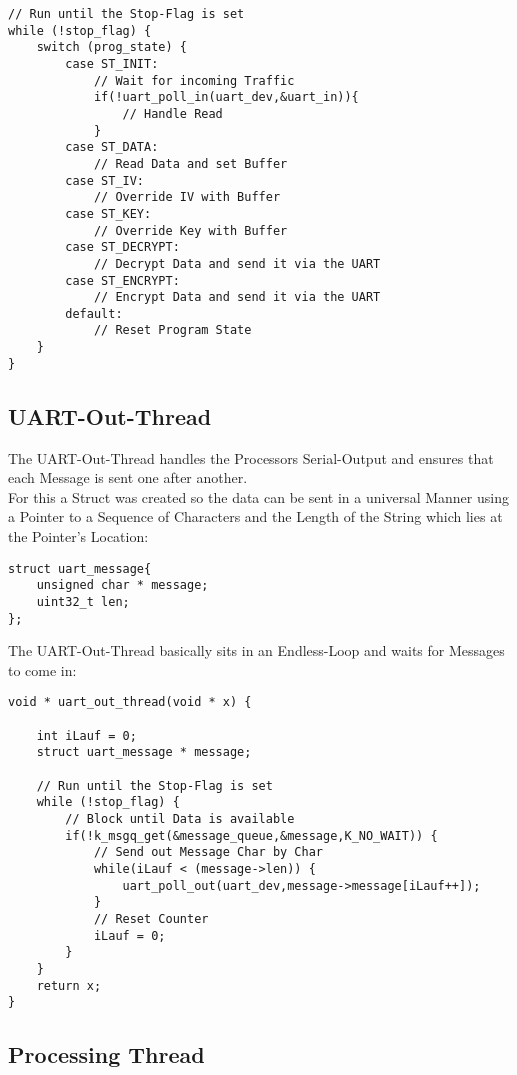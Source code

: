 \begin{lstlisting}[style=CStyle,caption=State Machine Pseudo-Code]
// Run until the Stop-Flag is set
while (!stop_flag) {
	switch (prog_state) {
		case ST_INIT:
            // Wait for incoming Traffic
            if(!uart_poll_in(uart_dev,&uart_in)){
				// Handle Read
			}
	    case ST_DATA:
			// Read Data and set Buffer
	    case ST_IV:
			// Override IV with Buffer
	    case ST_KEY:
			// Override Key with Buffer
	    case ST_DECRYPT:
			// Decrypt Data and send it via the UART
	    case ST_ENCRYPT:
			// Encrypt Data and send it via the UART
	    default:
			// Reset Program State
	}
}
\end{lstlisting}

\pagebreak

\subsection{UART-Out-Thread}

The UART-Out-Thread handles the Processors Serial-Output and ensures
that each Message is sent one after another.
\\
For this a Struct was created so the data can be sent in a universal
Manner using a Pointer to a Sequence of Characters and the Length of
the String which lies at the Pointer's Location:

\begin{lstlisting}[style=CStyle,caption=Message Struct Definition]
struct uart_message{
	unsigned char * message;
	uint32_t len;
};
\end{lstlisting}

The UART-Out-Thread basically sits in an Endless-Loop and waits
for Messages to come in:

\begin{lstlisting}[style=CStyle,caption=UART Out Thread Pseudo-Code]
void * uart_out_thread(void * x) {

	int iLauf = 0;
	struct uart_message * message;

	// Run until the Stop-Flag is set
	while (!stop_flag) {
		// Block until Data is available
		if(!k_msgq_get(&message_queue,&message,K_NO_WAIT)) {
			// Send out Message Char by Char
			while(iLauf < (message->len)) {
				uart_poll_out(uart_dev,message->message[iLauf++]);
			}
			// Reset Counter
			iLauf = 0;
		}
	}
	return x;
}
\end{lstlisting}

\pagebreak

\subsection{Processing Thread}

